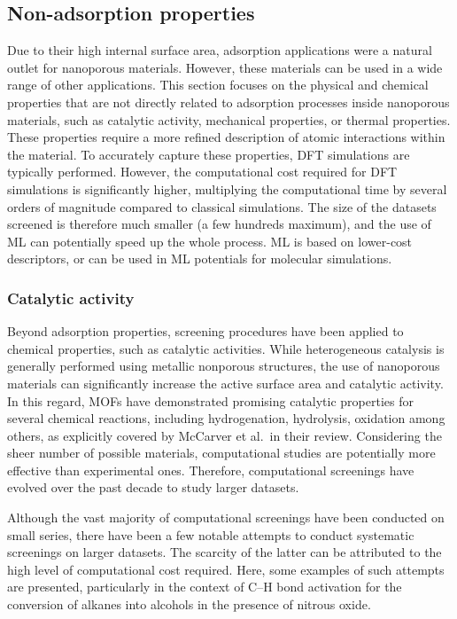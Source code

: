 \documentclass[main.tex]{subfiles}
\begin{document}
\subsection{Non-adsorption properties}

Due to their high internal surface area, adsorption applications were a natural outlet for nanoporous materials. However, these materials can be used in a wide range of other applications. This section focuses on the physical and chemical properties that are not directly related to adsorption processes inside nanoporous materials, such as catalytic activity,\autocite{Singh_2015, Greeley_2006, Back_2020}
mechanical properties,\autocite{Chibani_2019, Gaillac_2020}
or thermal properties.\autocite{Toher_2014, Sarikurt_2020, Ducamp_2021} These properties require a more refined description of atomic interactions within the material. To accurately capture these properties, DFT simulations are typically performed. However, the computational cost required for DFT simulations is significantly higher, multiplying the computational time by several orders of magnitude compared to classical simulations. The size of the datasets screened is therefore much smaller (a few hundreds maximum), and the use of ML can potentially speed up the whole process. ML is based on lower-cost descriptors,\autocite{Evans_2017, Ducamp_2022} or can be used in ML potentials for molecular simulations.\autocite{Eckhoff_2019,Friederich_2021}

\subsubsection{Catalytic activity}

Beyond adsorption properties, screening procedures have been applied to chemical properties, such as catalytic activities. While heterogeneous catalysis is generally performed using metallic nonporous structures, the use of nanoporous materials can significantly increase the active surface area and catalytic activity. In this regard, MOFs have demonstrated promising catalytic properties for several chemical reactions, including hydrogenation, hydrolysis, oxidation among others, as explicitly covered by McCarver et al.\ in their review.\autocite{McCarver_2021}
Considering the sheer number of possible materials, computational studies are potentially more effective than experimental ones. Therefore, computational screenings have evolved over the past decade to study larger datasets.

Although the vast majority of computational screenings have been conducted on small series, there have been a few notable attempts to conduct systematic screenings on larger datasets. The scarcity of the latter can be attributed to the high level of computational cost required. Here, some examples of such attempts are presented, particularly in the context of C--H bond activation for the conversion of alkanes into alcohols in the presence of nitrous oxide.
\end{document}
